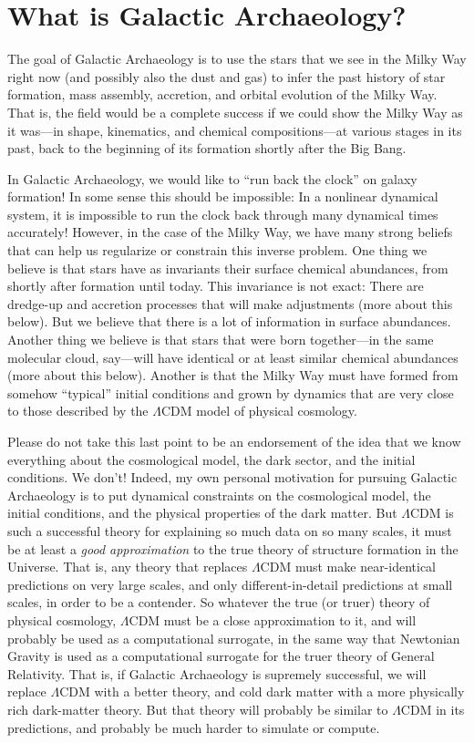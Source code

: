 \documentclass[11pt, letterpaper]{article}
\begin{document}
\section{What is Galactic Archaeology?}

The goal of Galactic Archaeology is to
use the stars that we see in the Milky Way right now (and possibly
also the dust and gas) to infer the past history of star formation,
mass assembly, accretion, and orbital evolution of the Milky Way. That
is, the field would be a complete success if we could show the Milky
Way as it was---in shape, kinematics, and chemical compositions---at
various stages in its past, back to the beginning of its formation
shortly after the Big Bang.

In Galactic Archaeology, we would like to ``run back the clock'' on
galaxy formation! In some sense this should be impossible: In a
nonlinear dynamical system, it is impossible to run the clock back
through many dynamical times accurately! However, in the case of the
Milky Way, we have many strong beliefs that can help us regularize or
constrain this inverse problem. One thing we believe is that stars
have as invariants their surface chemical abundances, from shortly
after formation until today. This invariance is not exact: There are
dredge-up and accretion processes that will make adjustments (more
about this below). But we believe that there is a lot of information
in surface abundances. Another thing we believe is that stars that
were born together---in the same molecular cloud, say---will have
identical or at least similar chemical abundances (more about this
below). Another is that the Milky Way must have formed from somehow
``typical'' initial conditions and grown by dynamics that are very
close to those described by the $\Lambda$CDM model of physical
cosmology.

Please do not take this last point to be an endorsement of the idea
that we know everything about the cosmological model, the dark sector,
and the initial conditions. We don't! Indeed, my own personal
motivation for pursuing Galactic Archaeology is to put dynamical
constraints on the cosmological model, the initial conditions, and the
physical properties of the dark matter. But $\Lambda$CDM is such a
successful theory for explaining so much data on so many scales, it
must be at least a \emph{good approximation} to the true theory of
structure formation in the Universe. That is, any theory that replaces
$\Lambda$CDM must make near-identical predictions on very large
scales, and only different-in-detail predictions at small scales, in
order to be a contender. So whatever the true (or truer) theory of
physical cosmology, $\Lambda$CDM must be a close approximation to it,
and will probably be used as a computational surrogate, in the same
way that Newtonian Gravity is used as a computational surrogate for
the truer theory of General Relativity. That is, if Galactic
Archaeology is supremely successful, we will replace $\Lambda$CDM with
a better theory, and cold dark matter with a more physically rich
dark-matter theory. But that theory will probably be similar to
$\Lambda$CDM in its predictions, and probably be much harder to
simulate or compute.
\end{document}
